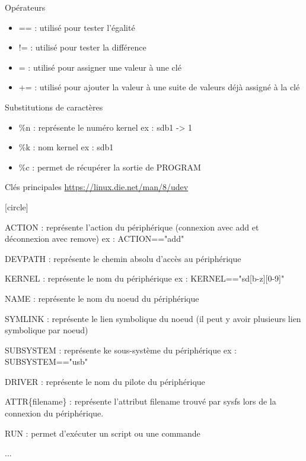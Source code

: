 \documentclass{beamer}
\begin{document}
\begin{frame}
\begin{block}{Opérateurs} 
	
	\begin{itemize}
		
		[circle]
		\item == : utilisé pour tester l'égalité
		\item != : utilisé pour tester la différence
		\item = : utilisé pour assigner une valeur à une clé
		\item += : utilisé pour ajouter la valeur à une suite de valeurs déjà assigné à la clé
	\end{itemize}
\end{block}

\begin{block}{Substitutions de caractères} 
	
	\begin{itemize}
		
		[circle]
		\item \%n : représente le numéro kernel ex : sdb1 -> 1
		\item \%k : nom kernel ex : sdb1 
		\item \%c : permet de récupérer la sortie de PROGRAM
	\end{itemize}
\end{block}

\end{frame}
\begin{frame}
\begin{block}{Clés principales \url{https://linux.die.net/man/8/udev}} 
	
	\begin{itemize}
		
		[circle]
		\footnotesize{
		\item ACTION : représente l'action du périphérique (connexion avec add et déconnexion avec remove) ex : ACTION=="add"
		\item DEVPATH : représente le chemin absolu d'accès au périphérique
		\item KERNEL : représente le nom du périphérique ex : KERNEL=="sd[b-z][0-9]"
		\item NAME : représente le nom du noeud du périphérique
		\item SYMLINK : représente le lien symbolique du noeud (il peut y avoir plusieurs lien symbolique par noeud)
		\item SUBSYSTEM : représente ke sous-système du périphérique ex : SUBSYSTEM=="usb"
		\item DRIVER : représente le nom du pilote du périphérique
		\item ATTR\{filename\} : représente l'attribut filename trouvé par sysfs lors de la connexion du périphérique.
		\item RUN : permet d'exécuter un script ou une commande
		\item ...
		
	}
	\end{itemize}
\end{block}
\end{frame}
\end{document}
